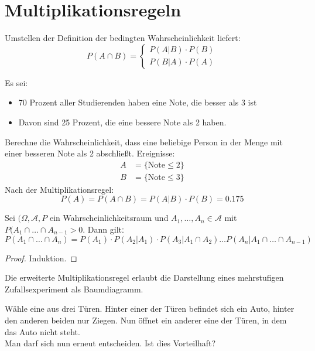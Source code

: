 \section{Multiplikationsregeln}
Umstellen der Definition der bedingten Wahrscheinlichkeit liefert:
\[
P(A \cap B) = \begin{cases}
	P(A|B) \cdot P(B) \\
	P(B|A) \cdot P(A)
\end{cases}
\]
\begin{example}[Notenverteilung]
Es sei:
\begin{itemize}
	\item 70 Prozent aller Studierenden haben eine Note, die besser als 3 ist
	\item Davon sind 25 Prozent, die eine bessere Note als 2 haben.
\end{itemize}
Berechne die Wahrscheinlichkeit, dass eine beliebige Person in der Menge mit einer besseren Note als 2 abschließt. Ereignisse:
\begin{align*}
	A&= \{\text{Note} \le 2\} \\
	B&= \{\text{Note} \le 3\} 
\end{align*}
Nach der Multiplikationsregel:
\[
P(A)= P(A \cap B) = P(A|B) \cdot P(B) = 0.175
\]
\end{example}
\begin{theorem}
	Sei $(\Omega, \mathcal{A}, P$ ein Wahrscheinlichkeitsraum und $A_1,\ldots,A_n \in \mathcal{A}$ mit $P(A_1 \cap \ldots \cap A_{n-1}>0$. Dann giltː
	\[
		P(A_1 \cap \ldots \cap A_n) = P(A_1)\cdot P(A_2 |A_1)\cdot  P(A_3| A_1 \cap A_2) \ldots P(A_n| A_1 \cap \ldots \cap A_{n-1})
	\]
\end{theorem}
\begin{proof}
Induktion. %
\end{proof}
Die erweiterte Multiplikationsregel erlaubt die Darstellung eines mehrstufigen Zufallsexperiment als Baumdiagramm.
\begin{example}[Ziegenproblem]
	Wähle eine aus drei Türen. Hinter einer der Türen befindet sich ein Auto, hinter den anderen beiden nur Ziegen. Nun öffnet ein anderer eine der Türen, in dem das Auto nicht steht. \\
	Man darf sich nun erneut entscheiden. Ist dies Vorteilhaft?
\end{example}
